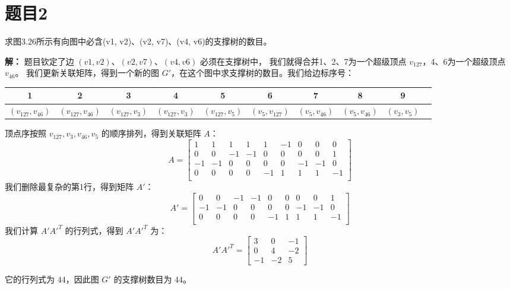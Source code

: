\documentclass[utf8]{ctexart}
\theoremstyle{mystyle}
\begin{document}
\newpage
\section*{题目2}
\begin{problembox}
    求图3.26所示有向图中必含(v1, v2)、(v2, v7)、(v4, v6)的支撑树的数目。
\end{problembox}
\textbf{解：} 题目钦定了边 $(v1, v2)$、$(v2, v7)$、$(v4, v6)$ 必须在支撑树中，
我们就得合并1、2、7为一个超级顶点 $v_{127}$，4、6为一个超级顶点 $v_{46}$。
我们更新关联矩阵，得到一个新的图 $G'$，在这个图中求支撑树的数目。我们给边标序号：
\medskip

\begin{tabular}{|c|c|c|c|c|c|c|c|c|c|}
\hline
1 & 2 & 3 & 4 & 5 & 6 & 7 & 8 & 9 \\
\hline
$(v_{127}, v_{46})$ & $(v_{127}, v_{46})$ & $(v_{127}, v_{3})$ & $(v_{127}, v_{3})$ & $(v_{127}, v_{5})$ & $(v_{5}, v_{127})$ & $(v_{5}, v_{46})$ & $(v_{5}, v_{46})$ & $(v_{3}, v_{5})$ \\
\hline
\end{tabular}
\medskip

顶点序按照 $v_{127}, v_{3}, v_{46}, v_{5}$ 的顺序排列，得到关联矩阵 $A$：
\[
A = \begin{bmatrix}
1 & 1 & 1 & 1 & 1 & -1 & 0 & 0 & 0 \\
0 & 0 & -1 & -1 & 0 & 0 & 0 & 0 & 1 \\
-1 & -1 & 0 & 0 & 0 & 0 & -1 & -1 & 0 \\
0 & 0 & 0 & 0 & -1 & 1 & 1 & 1 & -1 \\
\end{bmatrix}
\]
我们删除最复杂的第1行，得到矩阵 $A'$：
\[
A' = \begin{bmatrix}
0 & 0 & -1 & -1 & 0 & 0 & 0 & 0 & 1 \\
-1 & -1 & 0 & 0 & 0 & 0 & -1 & -1 & 0 \\
0 & 0 & 0 & 0 & -1 & 1 & 1 & 1 & -1 \\
\end{bmatrix}
\]
我们计算 $A'A'^T$ 的行列式，得到 $A'A'^T$ 为：
\[
A'A'^T = \begin{bmatrix}3 & 0 & -1 \\ 0 & 4 & -2 \\ -1 & -2 & 5\end{bmatrix}
\]

它的行列式为 $44$，因此图 $G'$ 的支撑树数目为 $44$。

\newpage
\end{document}
